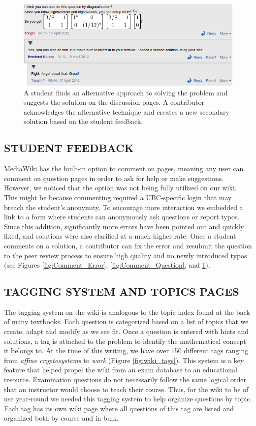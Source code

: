 \documentclass{primus}
\begin{document}
\begin{figure}[H]
\centering
\includegraphics[width=\textwidth]{figs/Comment_Suggestion.png}
\caption{A student finds an alternative approach to solving the problem and suggests the solution on the discussion pages.  A contributor acknowledges the alternative technique and creates a new secondary solution based on the student feedback.}\label{fig:Comment_Suggestion}
\end{figure}

\subsection{STUDENT FEEDBACK}\label{sec:Student_Feedback}
MediaWiki has the built-in option to comment on pages, meaning any user can comment on question pages in order to ask for help or make suggestions.  However, we noticed that the option was not being fully utilized on our wiki. This might be because commenting required a UBC-specific login that may breach the student’s anonymity. To encourage more interaction we embedded a link to a form where students can anonymously ask questions or report typos. Since this addition, significantly more errors have been pointed out and quickly fixed, and solutions were also clarified at a much higher rate. Once a student comments on a solution, a contributor can fix the error and resubmit the question to the peer review process to ensure high quality and no newly introduced typos (see Figures \ref{fig:Comment_Error}, \ref{fig:Comment_Question}, and \ref{fig:Comment_Suggestion}).

\subsection{TAGGING SYSTEM AND TOPICS PAGES}\label{sec:Tagging_System}
The tagging system on the wiki is analogous to the topic index found at the back of many textbooks. Each question is categorized based on a list of topics that we create, adapt and modify as we see fit.  Once a question is entered with hints and solutions, a tag is attached to the problem to identify the mathematical concept it belongs to. At the time of this writing, we have over 150 different tags ranging from \textit{affine cryptosystems} to \textit{work} (Figure \ref{fig:wiki_tags}). This system is a key feature that helped propel the wiki from an exam database to an educational resource. Examination questions do not necessarily follow the same logical order that an instructor would choose to teach their course. Thus, for the wiki to be of use year-round we needed this tagging system to help organize questions by topic. Each tag has its own wiki page where all questions of this tag are listed and organized both by course and in bulk. 
\end{document}
